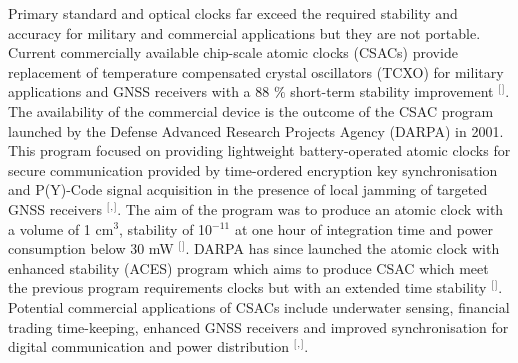 Primary standard and optical clocks far exceed the required stability and accuracy for military and commercial applications but they are not portable. Current commercially available chip-scale atomic clocks (CSACs) provide replacement of temperature compensated crystal oscillators (TCXO) for military applications and GNSS receivers with a 88 $\%$ short-term stability improvement $^[$\citep{Fernandez2017CSACPerformance.}$^]$. The availability of the commercial device is the outcome of the CSAC program launched by the Defense Advanced Research Projects Agency (DARPA) in 2001. This program focused on providing lightweight battery-operated atomic clocks for secure communication provided by time-ordered encryption key synchronisation and P(Y)-Code signal acquisition in the presence of local jamming of targeted GNSS receivers $^[$\citep{Lutwak2002TheInterrogation}$^,$\citep{Fruehauf2001FastClock.}$^]$. The aim of the program was to produce an atomic clock with a volume of 1 cm$^3$, stability of 10$^{-11}$ at one hour of integration time and power consumption below 30 mW $^[$\citep{LutwakR.DengJ.RileyW.andVargheseM.2004ThePackage}$^]$. DARPA has since launched the atomic clock with enhanced stability (ACES) program which aims to produce CSAC which meet the previous program requirements clocks but with an extended time stability $^[$\citep{DARPA2016Broad}$^]$. Potential commercial applications of CSACs include underwater sensing, financial trading time-keeping, enhanced GNSS receivers and improved synchronisation for digital communication and power distribution $^[$\citep{Lutwak2011PrinciplesClocks}$^,$\citep{KnappeChip-ScaleClock}$^]$. 



   


 





 













